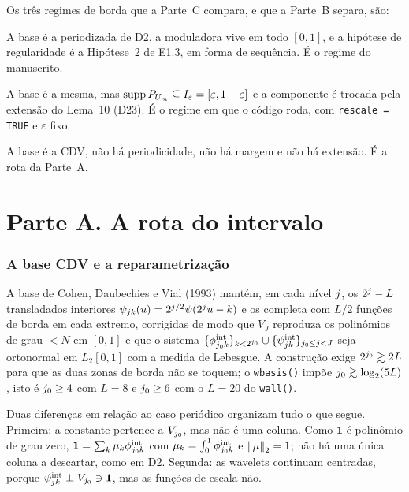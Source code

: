 \documentclass[11pt,a4paper]{article}
\newcommand{\eps}{\varepsilon}
\newcommand{\Ieps}{I_{\eps}}
\begin{document}
Os três regimes de borda que a Parte~C compara, e que a Parte~B separa, são:

\begin{description}[nosep]
  \item[(a) periódico com $\eps = 0$.] A base é a periodizada de D2, a
    moduladora vive em todo $[0,1]$, e a hipótese de regularidade é a
    Hipótese~2 de E1.3, em forma de sequência. É o regime do manuscrito.
  \item[(b) periódico com margem e extensão.] A base é a mesma, mas
    $\operatorname{supp}P_{U_{\md}} \subseteq \Ieps = [\eps, 1-\eps]$ e a
    componente é trocada pela extensão do Lema~10 (D23). É o regime em que o
    código roda, com \texttt{rescale = TRUE} e $\eps$ fixo.
  \item[(c) intervalo.] A base é a CDV, não há periodicidade, não há margem e
    não há extensão. É a rota da Parte~A.
\end{description}

\part*{Parte A. A rota do intervalo}

\section{A base CDV e a reparametrização}

A base de Cohen, Daubechies e Vial (1993) mantém, em cada nível $j$, os
$2^{j} - L$ transladados interiores $\psi_{jk}(u) =
2^{j/2}\psi(2^{j}u - k)$ e os completa com $L/2$ funções de borda em
cada extremo, corrigidas de modo que $V_{J}$ reproduza os polinômios de grau
$< N$ em $[0,1]$ e que o sistema
$\{\phi^{\mathrm{int}}_{j_{0}k}\}_{k<2^{j_{0}}} \cup
\{\psi^{\mathrm{int}}_{jk}\}_{j_{0}\le j<J}$ seja ortonormal em
$L_{2}[0,1]$ com a medida de Lebesgue. A construção exige
$2^{j_{0}}\gtrsim 2L$ para que as duas zonas de borda não se toquem; o
\texttt{wbasis()} impõe $j_{0} \gtrsim \log_{2}(5L)$, isto é
$j_{0} \ge 4$ com $L = 8$ e $j_{0} \ge 6$ com o $L = 20$ do \texttt{wall()}.

Duas diferenças em relação ao caso periódico organizam tudo o que segue.
Primeira: a constante pertence a $V_{j_{0}}$, mas não é uma coluna. Como
$\mathbf{1}$ é polinômio de grau zero, $\mathbf{1} = \sum_{k}\mu_{k}
\phi^{\mathrm{int}}_{j_{0}k}$ com $\mu_{k} =
\int_{0}^{1}\phi^{\mathrm{int}}_{j_{0}k}$ e $\left\lVert \mu \right\rVert_{2} = 1$; não há
uma única coluna a descartar, como em D2. Segunda: as wavelets continuam
centradas, porque $\psi^{\mathrm{int}}_{jk} \perp V_{j_{0}} \ni
\mathbf{1}$, mas as funções de escala não.
\end{document}
